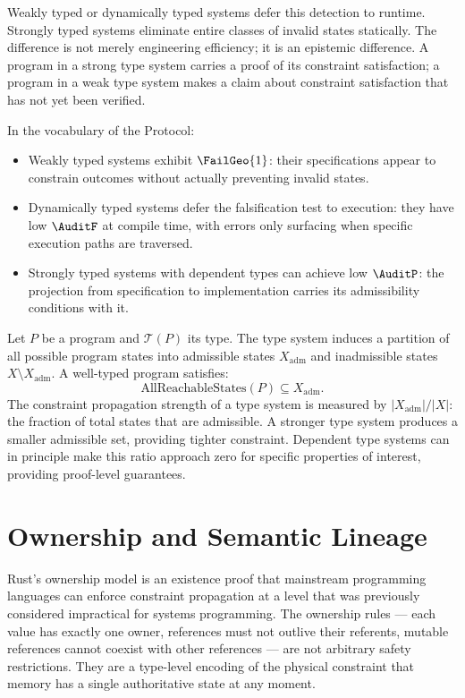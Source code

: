Weakly typed or dynamically typed systems defer this
detection to runtime. Strongly typed systems eliminate
entire classes of invalid states statically. The
difference is not merely engineering efficiency; it
is an epistemic difference. A program in a strong
type system carries a proof of its constraint
satisfaction; a program in a weak type system makes
a claim about constraint satisfaction that has not
yet been verified.

In the vocabulary of the \Ortyx{} Protocol:

\begin{itemize}
  \item Weakly typed systems exhibit $\FailGeo{1}$:
  their specifications appear to constrain outcomes
  without actually preventing invalid states.
  \item Dynamically typed systems defer the falsification
  test to execution: they have low $\AuditF$ at compile
  time, with errors only surfacing when specific execution
  paths are traversed.
  \item Strongly typed systems with dependent types
  can achieve low $\AuditP$: the projection from
  specification to implementation carries its admissibility
  conditions with it.
\end{itemize}

\begin{technote}
Let $P$ be a program and $\mathcal{T}(P)$ its type.
The type system induces a partition of all possible
program states into admissible states $X_{\mathrm{adm}}$
and inadmissible states $X \setminus X_{\mathrm{adm}}$.
A well-typed program satisfies:
\[
  \text{AllReachableStates}(P) \subseteq X_{\mathrm{adm}}.
\]
The constraint propagation strength of a type system
is measured by $|X_{\mathrm{adm}}| / |X|$: the
fraction of total states that are admissible. A stronger
type system produces a smaller admissible set, providing
tighter constraint. Dependent type systems can in
principle make this ratio approach zero for specific
properties of interest, providing proof-level guarantees.
\end{technote}

\section{Ownership and Semantic Lineage}
\label{sec:ownership}

Rust's ownership model is an existence proof that
mainstream programming languages can enforce
constraint propagation at a level that was previously
considered impractical for systems programming. The
ownership rules --- each value has exactly one owner,
references must not outlive their referents, mutable
references cannot coexist with other references ---
are not arbitrary safety restrictions. They are a
type-level encoding of the physical constraint that
memory has a single authoritative state at any moment.

